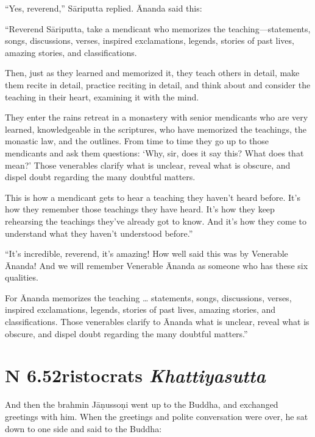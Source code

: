 \documentclass[12pt,openany]{book}%
\newcommand*{\suttatitleacronym}[1]{\smaller[2]{#1}\vspace*{.3em}}
\newcommand*{\suttatitletranslation}[1]{\linebreak{#1}}
\newcommand*{\suttatitleroot}[1]{\linebreak\smaller[2]\itshape{#1}}
\newcommand*{\tocacronym}[1]{\hspace*{-3.3em}{#1}\quad}
\newcommand*{\toctranslation}[1]{#1}
\newcommand*{\tocroot}[1]{(\textit{#1})}
\begin{document}
“Yes, reverend,” \textsanskrit{Sāriputta} replied. Ānanda said this: 

“Reverend \textsanskrit{Sāriputta}, take a mendicant who memorizes the teaching—statements, songs, discussions, verses, inspired exclamations, legends, stories of past lives, amazing stories, and classifications. 

Then, just as they learned and memorized it, they teach others in detail, make them recite in detail, practice reciting in detail, and think about and consider the teaching in their heart, examining it with the mind. 

They enter the rains retreat in a monastery with senior mendicants who are very learned, knowledgeable in the scriptures, who have memorized the teachings, the monastic law, and the outlines. From time to time they go up to those mendicants and ask them questions: ‘Why, sir, does it say this? What does that mean?’ Those venerables clarify what is unclear, reveal what is obscure, and dispel doubt regarding the many doubtful matters. 

This is how a mendicant gets to hear a teaching they haven’t heard before. It’s how they remember those teachings they have heard. It’s how they keep rehearsing the teachings they’ve already got to know. And it’s how they come to understand what they haven’t understood before.” 

“It’s incredible, reverend, it’s amazing! How well said this was by Venerable Ānanda! And we will remember Venerable Ānanda as someone who has these six qualities. 

For Ānanda memorizes the teaching … statements, songs, discussions, verses, inspired exclamations, legends, stories of past lives, amazing stories, and classifications. Those venerables clarify to Ānanda what is unclear, reveal what is obscure, and dispel doubt regarding the many doubtful matters.” 

%
\section*{{\suttatitleacronym AN 6.52}{\suttatitletranslation Aristocrats }{\suttatitleroot Khattiyasutta}}
\addcontentsline{toc}{section}{\tocacronym{AN 6.52} \toctranslation{Aristocrats } \tocroot{Khattiyasutta}}

And then the brahmin \textsanskrit{Jāṇussoṇi} went up to the Buddha, and exchanged greetings with him. When the greetings and polite conversation were over, he sat down to one side and said to the Buddha: 
\end{document}
